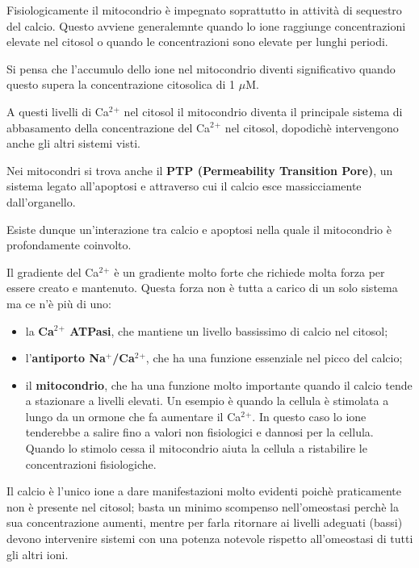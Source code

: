 \documentclass[]{article}
\begin{document}
Fisiologicamente il mitocondrio è impegnato soprattutto in attività di
sequestro del calcio. Questo avviene generalemnte quando lo ione
raggiunge concentrazioni elevate nel citosol o quando le concentrazioni
sono elevate per lunghi periodi.

Si pensa che l'accumulo dello ione nel mitocondrio diventi significativo
quando questo supera la concentrazione citosolica di 1 \(\mu\)M.

A questi livelli di Ca\(^2\)\(^+\) nel citosol il mitocondrio diventa il
principale sistema di abbasamento della concentrazione del
Ca\(^2\)\(^+\) nel citosol, dopodichè intervengono anche gli altri
sistemi visti.

Nei mitocondri si trova anche il \textbf{PTP (Permeability Transition
Pore)}, un sistema legato all'apoptosi e attraverso cui il calcio esce
massicciamente dall'organello.

Esiste dunque un'interazione tra calcio e apoptosi nella quale il
mitocondrio è profondamente coinvolto.

Il gradiente del Ca\(^2\)\(^+\) è un gradiente molto forte che richiede
molta forza per essere creato e mantenuto. Questa forza non è tutta a
carico di un solo sistema ma ce n'è più di uno:

\begin{itemize}
\itemsep1pt\parskip0pt
\item
  la \textbf{Ca\(^2\)\(^+\) ATPasi}, che mantiene un livello bassissimo
  di calcio nel citosol;
\item
  l'\textbf{antiporto Na\(^+\)/Ca\(^2\)\(^+\)}, che ha una funzione
  essenziale nel picco del calcio;
\item
  il \textbf{mitocondrio}, che ha una funzione molto importante quando
  il calcio tende a stazionare a livelli elevati. Un esempio è quando la
  cellula è stimolata a lungo da un ormone che fa aumentare il
  Ca\(^2\)\(^+\). In questo caso lo ione tenderebbe a salire fino a
  valori non fisiologici e dannosi per la cellula. Quando lo stimolo
  cessa il mitocondrio aiuta la cellula a ristabilire le concentrazioni
  fisiologiche.
\end{itemize}

Il calcio è l'unico ione a dare manifestazioni molto evidenti poichè
praticamente non è presente nel citosol; basta un minimo scompenso
nell'omeostasi perchè la sua concentrazione aumenti, mentre per farla
ritornare ai livelli adeguati (bassi) devono intervenire sistemi con una
potenza notevole rispetto all'omeostasi di tutti gli altri ioni.
\end{document}
